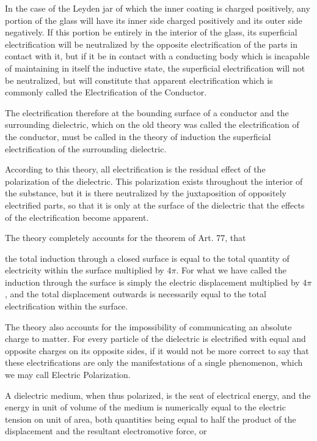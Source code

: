 \documentclass[11pt,a4paper]{article}
\begin{document}
In the case of the Leyden jar of which the inner coating is charged positively, any portion of the glass will have its inner side charged positively and its outer side negatively. If this portion be entirely in the interior of the glass, its superficial electrification will be neutralized by the opposite electrification of the parts in contact with it, but if it be in contact with a conducting body which is incapable of maintaining in itself the inductive state, the superficial electrification will not be neutralized, but will constitute that apparent electrification which is commonly called the Electrification of the Conductor.

The electrification therefore at the bounding surface of a conductor and the surrounding dielectric, which on the old theory was called the electrification of the conductor, must be called in the theory of induction the superficial electrification of the surrounding dielectric.

According to this theory, all electrification is the residual effect of the polarization of the dielectric. This polarization exists throughout the interior of the substance, but it is there neutralized by the juxtaposition of oppositely electrified parts, so that it is only at the surface of the dielectric that the effects of the electrification become apparent.

The theory completely accounts for the theorem of Art. 77, that

the total induction through a closed surface is equal to the total quantity of electricity within the surface multiplied by $4\pi$. For what we have called the induction through the surface is simply the electric displacement multiplied by $4\pi$, and the total displacement outwards is necessarily equal to the total electrification within the surface.

The theory also accounts for the impossibility of communicating an absolute charge to matter. For every particle of the dielectric is electrified with equal and opposite charges on its opposite sides, if it would not be more correct to say that these electrifications are only the manifestations of a single phenomenon, which we may call Electric Polarization.

A dielectric medium, when thus polarized, is the seat of electrical energy, and the energy in unit of volume of the medium is numerically equal to the electric tension on unit of area, both quantities being equal to half the product of the displacement and the resultant electromotive force, or
\end{document}
